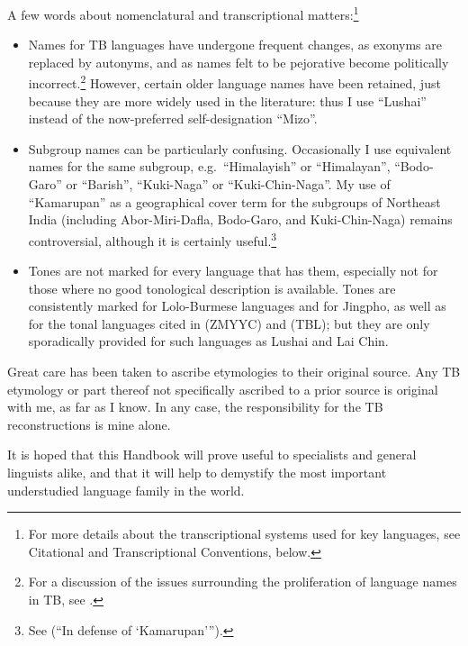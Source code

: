 A few words about nomenclatural and transcriptional matters:\footnote{For more details about the transcriptional systems used for key languages, see Citational and Transcriptional Conventions, below.}
\begin{itemize}

\item Names for TB languages have undergone frequent changes, as exonyms are replaced by autonyms, and as names felt to be pejorative become politically incorrect.\footnote{For a discussion of the issues surrounding the proliferation of language names in TB, see \citealt{JAM-LDTB}.} However, certain older language names have been retained, just because they are more widely used in the literature: thus I use “Lushai” instead of the now-preferred self-designation “Mizo”.
\item Subgroup names can be particularly confusing. Occasionally I use equivalent names for the same subgroup, e.g.\ “Himalayish” or “Himalayan”, “Bodo-Garo” or “Barish”, “Kuki-Naga” or “Kuki-Chin-Naga”. My use of “Kamarupan” as a geographical cover term for the subgroups of Northeast India (including Abor-Miri-Dafla, Bodo-Garo, and Kuki-Chin-Naga) remains controversial, although it is certainly useful.\footnote{See \citealt{JAM-IDK} (“In defense of ‘Kamarupan’\thinspace”).}
\item Tones are not marked for every language that has them, especially not for those where no good tonological description is available. Tones are consistently marked for Lolo-Burmese languages and for Jingpho, as well as for the tonal languages cited in \citealt{ZMYYC} (ZMYYC) and \citealt{TBL} (TBL); but they are only sporadically provided for such languages as Lushai and Lai Chin.
\end{itemize}

Great care has been taken to ascribe etymologies to their original source. Any TB etymology or part thereof not specifically ascribed to a prior source is original with me, as far as I know. In any case, the responsibility for the TB reconstructions is mine alone.

It is hoped that this Handbook will prove useful to specialists and general linguists alike, and that it will help to demystify the most important understudied language family in the world.
